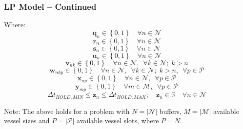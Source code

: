 \documentclass{beamer}
\begin{document}
\begin{frame}
\frametitle{LP Model -- Continued}
\footnotesize
Where:
\begin{equation*}
    \boldsymbol{q}_{n} \in \left\{0, 1\right\} \quad \forall n \in \mathcal{N}
\end{equation*}
\begin{equation*}
    \boldsymbol{r}_{n} \in \left\{ 0, 1 \right\} \quad \forall n \in
    \mathcal{N}
\end{equation*}
\begin{equation*}
    \boldsymbol{s}_{n} \in \left\{ 0, 1 \right\} \quad \forall n \in
    \mathcal{N}
\end{equation*} 
\begin{equation*}
    \boldsymbol{u}_{n} \in \left\{ 0, 1 \right\} \quad \forall n \in
    \mathcal{N}
\end{equation*}
\begin{equation*}
    \boldsymbol{v}_{nk} \in \left\{ 0, 1 \right\} \quad \forall n \in
    \mathcal{N}, \enspace \forall k \in \mathcal{N}; \; k > n
\end{equation*}
\begin{equation*}
    \boldsymbol{w}_{nkp} \in \left\{ 0, 1 \right\} \quad \forall n \in
    \mathcal{N}, \enspace \forall k \in \mathcal{N}; \; k > n, \enspace \forall
    p \in \mathcal{P}
\end{equation*}
\begin{equation*}
    \boldsymbol{x}_{np} \in \left\{ 0, 1 \right\} \quad \forall n \in
    \mathcal{N}, \enspace \forall p \in \mathcal{P}
\end{equation*}
\begin{equation*}
    \boldsymbol{y}_{mp} \in \left\{ 0, 1 \right\} \quad \forall m \in
    \mathcal{M}, \enspace \forall p \in \mathcal{P}
\end{equation*}
\begin{equation*}
    \Delta t_{\mathit{HOLD,MIN}} \le \boldsymbol{z}_{n} \le 
    \Delta t_{\mathit{HOLD,MAX}}; \quad
    \boldsymbol{z}_{n} \in \mathbb{R} \quad \forall n \in \mathcal{N}
\end{equation*}
\vspace{0.5cm}

Note: The above holds for a problem with $N = |\mathcal{N}|$ buffers,
$M = |\mathcal{M}|$ available vessel sizes and $P = |\mathcal{P}|$ 
available vessel slots, where $P = N$.
\end{frame}
\end{document}
